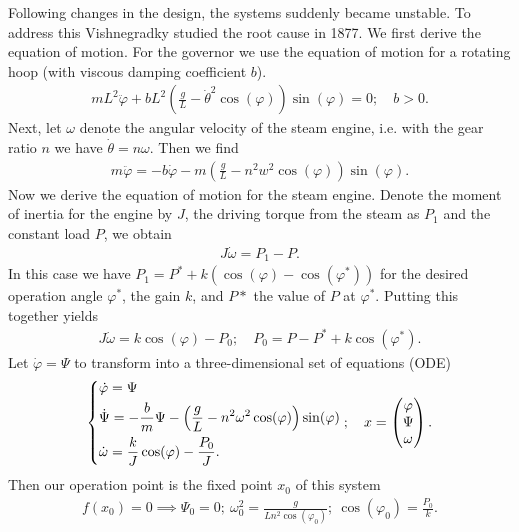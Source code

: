 \begin{ex}
Following changes in the design, the systems suddenly became unstable. To address this Vishnegradky studied the root cause in 1877. We first derive the equation of motion. For the governor we use the equation of motion for a rotating hoop (with viscous damping coefficient $b$).
\begin{align}
	mL^2 \ddot{\varphi} + bL^2\left( \frac{g}{L} - \dot{\theta}^2 \cos(\varphi) \right) \sin(\varphi) = 0;\quad b>0.
\end{align}
Next, let $\omega $ denote the angular velocity of the steam engine, i.e. with the gear ratio $n$ we have $\dot{\theta} = n \omega$. Then we find
\begin{align}
	m \ddot{\varphi} = -b \dot{\varphi} - m \left( \frac{g}{L} - n^2 w^2 \cos(\varphi) \right) \sin(\varphi).
\end{align}
Now we derive the equation of motion for the steam engine. Denote the moment of inertia for the engine by $J$, the driving torque from the steam as $P_1$ and the constant load $P$, we obtain
\begin{align}
	J \dot{\omega } = P_1 - P.
\end{align}
In this case we have $P_1 = P^{*} + k\left( \cos(\varphi) - \cos(\varphi^{*}) \right)$ for the desired operation angle $\varphi^{*}$, the gain $k$, and $P*$ the value of $P$ at $\varphi^{*}$. Putting this together yields
\begin{align}
	J \dot{\omega } = k \cos(\varphi) - P_0;\quad P_0 = P - P^{*} + k \cos(\varphi^{*}).
\end{align}
Let $\dot{\varphi} = \Psi$ to transform into a three-dimensional set of equations (ODE)
\begin{align}
	\begin{dcases}
		\dot{\varphi} = \Psi \\
		\dot{\Psi} = -\frac{b}{m} \Psi - \left( \frac{g}{L} - n^2 \omega^2 \cos(\varphi) \right) \sin (\varphi) \\
		\dot{\omega } = \frac{k}{J}\cos(\varphi) - \frac{P_0}{J}.
	\end{dcases};
	\quad x =
	\begin{pmatrix}
		\varphi \\ \Psi \\ \omega 
	\end{pmatrix}
	.
\end{align}
Then our operation point is the fixed point $x_0$ of this system
\begin{align}
	f(x_0) = 0 \implies \Psi_0 = 0;\ \omega_0^2 = \frac{g}{Ln^2 \cos(\varphi_0)};\ \cos(\varphi_0) = \frac{P_0}{k}.

\end{align}
\end{ex}
